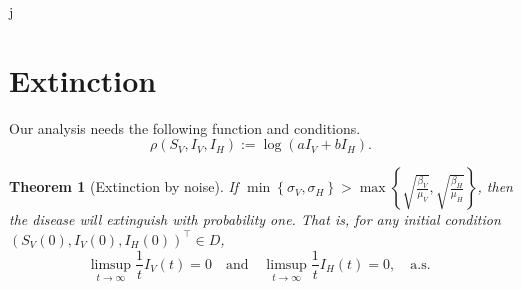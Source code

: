 j\documentclass{amsart}
\theoremstyle{plain}
\newtheorem{theorem}{Theorem}
\theoremstyle{definition}
\begin{document}
    \section{Extinction}
        Our analysis needs the following function and conditions.
        \begin{equation}
            \rho (S_V, I_V, I_H) := \log (a I_V + b I_H) .
        \end{equation}
%
%
%
%
%
        \begin{theorem}[Extinction by noise]
                If 
                $
                    \displaystyle
                    \min
                        \left \{
                              \sigma_V, \sigma_H 
                        \right\} 
                        > 
                    \max 
                        \left \{
                            \sqrt{\frac{\beta_V}{\mu_V}},
                            \sqrt{\frac{\beta_H}{\mu_H}}
                        \right \}
                $,
                then the disease will extinguish with probability one.  That is,
                for any initial condition $(S_V(0), I_V(0), I_H(0)) ^{\top} \in 
                D$,
                $$
                    \limsup_{t \to \infty} 
                        \frac{1}{t} I_V(t) = 0 
                        \quad \text{and} \quad
                    \limsup_{t \to \infty} 
                        \frac{1}{t} I_H(t) = 0, \quad 
                        \text{
                           a.s.
                        }
                $$
        \end{theorem}        
\end{document}
